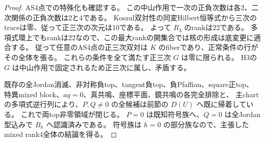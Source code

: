 \begin{proof}
AS4点での特殊化も確認する。
この中山作用で一次の正負次数は各2、二次関係の正負次数は2と4である。
Koszul双対性の同変Hilbert恒等式から三次のtraceは零、従って正三次の次元は10である。
よって $R_3$ のrankは22である。
多項式環上でもrankは22なので、この最大rankの開集合では核の形成は底変更に適合する。
従って任意のAS4点の正三次双対は $K$ のfiberであり、正常条件の行がその全体を張る。
これらの条件を全て満たす正三次 $G$ は零に限られる。
H3の $G$ は中山作用で固定されるため正三次に属し、矛盾する。

既存の全Jordan消滅、非対称負top、tangent負top、負Pfaffian、square正top、
特異mixed block、$aq=0$、真共鳴、座標平面、鏡共鳴の各完全排除と、
主chartの多項式逆行列により、$P,Q\ne0$ の全候補は前節の $D(U)$ へ既に帰着している。
これで両top非零領域が閉じる。
$P=0$ は既知符号族へ、$Q=0$ は全Jordan型込みで $B_h$ へ認識済みである。
符号族は $h=0$ の部分族なので、主張したmixed rank4全体の結論を得る。
\end{proof}
